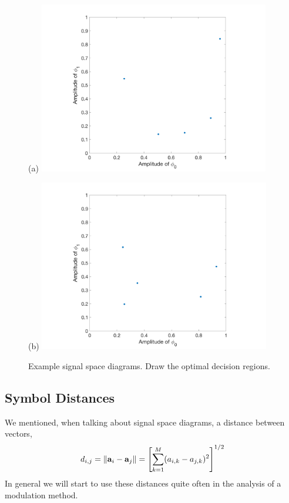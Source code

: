 \begin{figure}[htbp]
  \centerline{(a) \includegraphics[width=0.9\textwidth]{../images/ExampleVoronoiDiagram_1.png}}
\centerline{  (b) \includegraphics[width=0.9\textwidth]{../images/ExampleVoronoiDiagram.png}}
  \caption{Example signal space diagrams.  Draw the optimal decision regions.}
  \label{F:DetectionRegionsExample}
\end{figure}



\subsection{Symbol Distances}

We mentioned, when talking about signal space diagrams, a distance between vectors,
\[
 d_{i,j} = \| \mathbf{a}_i - \mathbf{a}_j \| = \left[ \sum_{k=1}^M (a_{i,k} -
 a_{j,k})^2 \right]^{1/2}
\]
In general we will start to use these distances quite often in the analysis of a modulation method.
